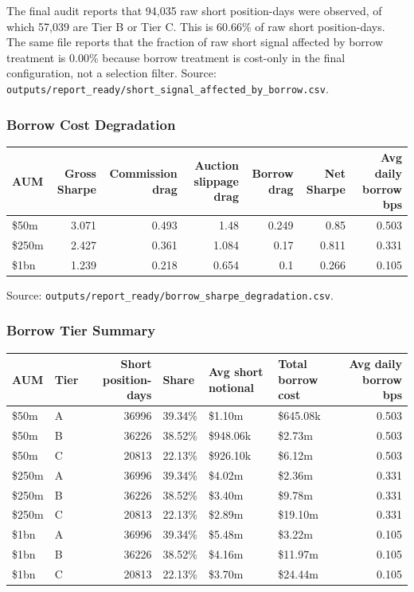 \documentclass[
]{article}
\begin{document}
The final audit reports that 94,035 raw short position-days were
observed, of which 57,039 are Tier B or Tier C. This is 60.66\% of raw
short position-days. The same file reports that the fraction of raw
short signal affected by borrow treatment is 0.00\% because borrow
treatment is cost-only in the final configuration, not a selection
filter. Source:
\texttt{outputs/report\_ready/short\_signal\_affected\_by\_borrow.csv}.

\hypertarget{borrow-cost-degradation}{%
\subsubsection{Borrow Cost Degradation}\label{borrow-cost-degradation}}

\begin{longtable}[]{@{}lrrrrrr@{}}
\toprule
AUM & Gross Sharpe & Commission drag & Auction slippage drag & Borrow
drag & Net Sharpe & Avg daily borrow bps \\
\midrule
\endhead
\$50m & 3.071 & 0.493 & 1.48 & 0.249 & 0.85 & 0.503 \\
\$250m & 2.427 & 0.361 & 1.084 & 0.17 & 0.811 & 0.331 \\
\$1bn & 1.239 & 0.218 & 0.654 & 0.1 & 0.266 & 0.105 \\
\bottomrule
\end{longtable}

Source: \texttt{outputs/report\_ready/borrow\_sharpe\_degradation.csv}.

\hypertarget{borrow-tier-summary}{%
\subsubsection{Borrow Tier Summary}\label{borrow-tier-summary}}

\begin{longtable}[]{@{}llrlllr@{}}
\toprule
AUM & Tier & Short position-days & Share & Avg short notional & Total
borrow cost & Avg daily borrow bps \\
\midrule
\endhead
\$50m & A & 36996 & 39.34\% & \$1.10m & \$645.08k & 0.503 \\
\$50m & B & 36226 & 38.52\% & \$948.06k & \$2.73m & 0.503 \\
\$50m & C & 20813 & 22.13\% & \$926.10k & \$6.12m & 0.503 \\
\$250m & A & 36996 & 39.34\% & \$4.02m & \$2.36m & 0.331 \\
\$250m & B & 36226 & 38.52\% & \$3.40m & \$9.78m & 0.331 \\
\$250m & C & 20813 & 22.13\% & \$2.89m & \$19.10m & 0.331 \\
\$1bn & A & 36996 & 39.34\% & \$5.48m & \$3.22m & 0.105 \\
\$1bn & B & 36226 & 38.52\% & \$4.16m & \$11.97m & 0.105 \\
\$1bn & C & 20813 & 22.13\% & \$3.70m & \$24.44m & 0.105 \\
\bottomrule
\end{longtable}
\end{document}
